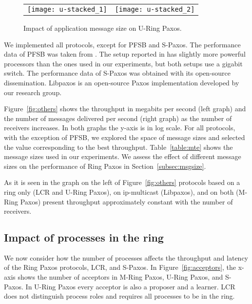 \documentclass[final,3p,times,twocolumn,authoryear]{elsarticle}
\begin{document}
\begin{figure*}
  \begin{center}
    \begin{tabular}{c@{}c}
      \texttt{[image: u-stacked\_1]} &
      \texttt{[image: u-stacked\_2]}\\
   \end{tabular}
\caption{Impact of application message size on U-Ring Paxos.}
    \label{fig:unicast-msize}

  \end{center}
\end{figure*}


We implemented all protocols, except for PFSB and S-Paxos. 
The performance data of PFSB was taken from \cite{KA08}. The setup reported in \cite{KA08} has slightly more powerful processors than the ones used in our experiments, but both setups use a gigabit switch. The performance data of S-Paxos was obtained with its open-source dissemination. Libpaxos is an open-source Paxos implementation developed by our research group.


Figure~\ref{fig:others} shows the throughput in megabits per second (left graph) and the number of messages delivered per second (right graph) as the number of receivers increases. In both graphs the y-axis is in log scale. 
For all protocols, with the exception of PFSB, we explored the space of message sizes and selected the value corresponding to the best throughput. Table~\ref{table:mte} shows the message sizes used in our experiments. We assess the effect of different message sizes on the performance of Ring Paxos in Section~\ref{subsec:msgsize}.



As it is seen in the graph on the left of Figure~\ref{fig:others} protocols based on a ring only (LCR and U-Ring Paxos), on ip-multicast (Libpaxos), and on both (M-Ring Paxos) present throughput approximately constant with the number of receivers. 



\subsection{Impact of processes in the ring}
\label{sec:procring}

We now consider how the number of processes affects the throughput and latency of the Ring Paxos protocols, LCR, and S-Paxos. 
In Figure~\ref{fig:acceptors}, the x-axis shows the number of acceptors in M-Ring Paxos, U-Ring Paxos, and S-Paxos. In U-Ring Paxos every acceptor is also a proposer and a learner. 
LCR does not distinguish process roles and requires all processes to be in the ring. 
\end{document}
